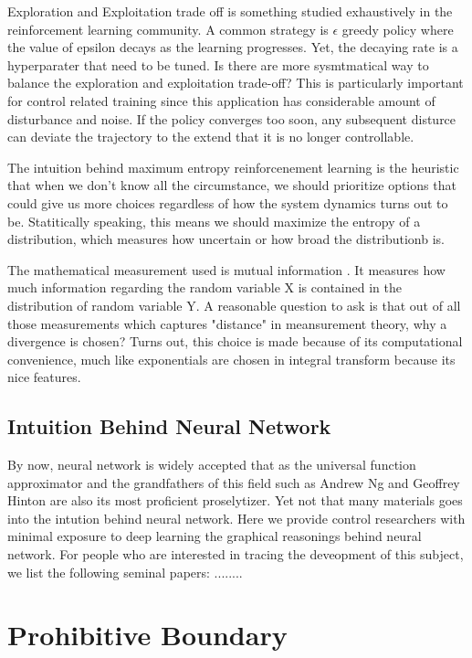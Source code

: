 \documentclass[journal]{IEEEtran}
\begin{document}
Exploration and Exploitation trade off is something studied exhaustively in the reinforcement learning community. A common strategy is $\epsilon$ greedy policy where the value of epsilon decays as the learning progresses. Yet, the decaying rate is a hyperparater that need to be tuned. Is there are more sysmtmatical way to balance the exploration and exploitation trade-off? This is particularly important for control related training since this application has considerable amount of disturbance and noise. If the policy converges too soon, any subsequent disturce can deviate the trajectory to the extend that it is no longer controllable.

The intuition behind maximum entropy reinforcenement learning is the heuristic that when we don't know all the circumstance, we should prioritize options that could give us more choices regardless of how the system dynamics turns out to be. Statitically speaking, this means we should maximize the entropy of a distribution, which measures how uncertain or how broad the distributionb is.

The mathematical measurement used is mutual information \cite{Kullback1951ONIA}. It measures how much information regarding the random variable X is contained in the distribution of random variable Y. A reasonable question to ask is that out of all those measurements which captures "distance" in meansurement theory, why a divergence is chosen? Turns out, this choice is made because of its computational convenience, much like exponentials are chosen in integral transform because its nice features.

\subsection{Intuition Behind Neural Network}
By now, neural network is widely accepted that as the universal function approximator \cite{Hornik1991ApproximationCO} and the grandfathers of this field such as Andrew Ng and Geoffrey Hinton are also its most proficient proselytizer. Yet not that many materials goes into the intution behind neural network. Here we provide control researchers with minimal exposure to deep learning the graphical reasonings behind neural network. For people who are interested in tracing the deveopment of this subject, we list the following seminal papers: \cite{Schwartz1989TheNC} \cite{Hornik1989MultilayerFN}........


\section{Prohibitive Boundary}
\end{document}
